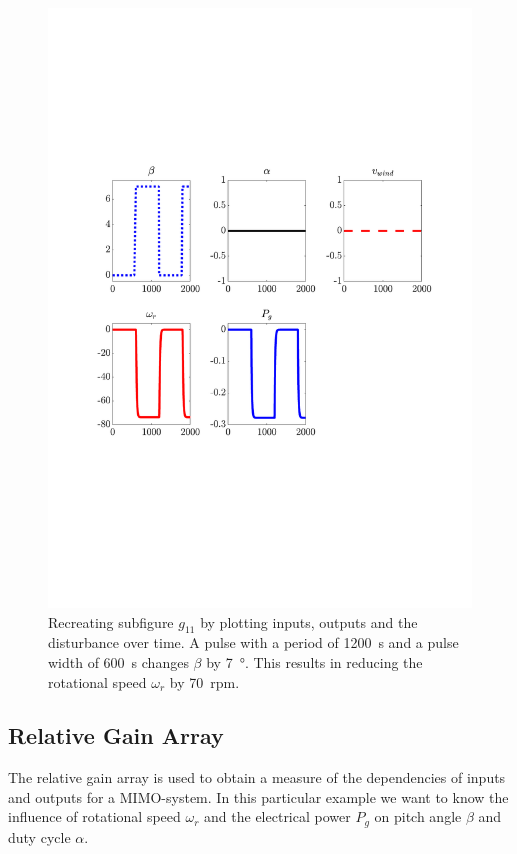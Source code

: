 \begin{figure}[h!]
    \center
    \includegraphics[scale=0.7,trim=60 200 50 150,clip]{fig/recreate_step_changes.pdf}
    \caption{Recreating subfigure $g_{11}$ by plotting inputs, outputs and the disturbance over time. A pulse with a period of \SI{1200}{\second} and a pulse width of \SI{600}{\second} changes $\beta$ by \SI{7}{\degree}. This results in reducing the rotational speed $\omega_r$ by \SI{70}{rpm}.}
    \label{fig:analysis:recreate_step_changes}
\end{figure}



\subsection{Relative Gain Array}  \label{sec:analysis:RGA}

The relative gain array is used to obtain a measure of the dependencies of inputs and outputs for a MIMO-system.
In this particular example we want to know the influence of rotational speed $\omega_r$ and the electrical power $P_g$ on pitch angle $\beta$ and duty cycle $\alpha$.


